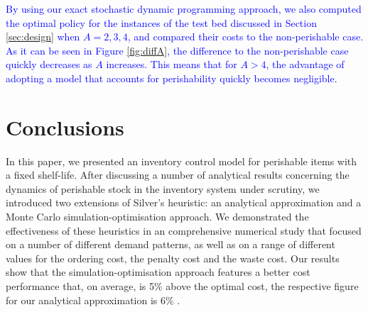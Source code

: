 \documentclass{tPRS2e}
\newcommand{\blue}{\textcolor{blue}}
\begin{document}



\blue{By using our exact stochastic dynamic programming approach, we also computed the optimal policy for the instances of the test bed discussed in Section \ref{sec:design} when $A=2,3,4$, and compared their costs to the non-perishable case. As it can be seen in Figure \ref{fig:diffA}, the difference to the non-perishable case quickly decreases as $A$ increases. This means that for $A>4$, the advantage of adopting a model that accounts for perishability quickly becomes negligible.}





\section{Conclusions}
\label{sec:conclusions}

In this paper, we presented an inventory control model for perishable items with a fixed shelf-life. After discussing a number of analytical results concerning the dynamics of perishable stock in the inventory system under scrutiny, we introduced two extensions of Silver's heuristic: an analytical approximation and a Monte Carlo simulation-optimisation approach.  We demonstrated the effectiveness of these heuristics in an comprehensive numerical study that focused on a number of different demand patterns, as well as on a range of different values for the ordering cost, the penalty cost and the waste cost. Our results show that the simulation-optimisation approach features a better cost performance that, on average, is 5\% above the optimal cost, the respective figure for our analytical approximation is 6\% . 
\end{document}

